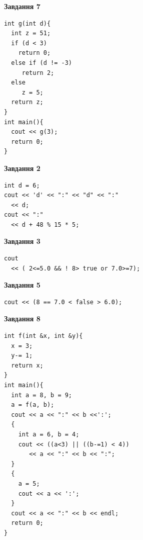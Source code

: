 \documentclass[12pt, ukrainian]{article}
\begin{document}
{\begin {large}
\begin{minipage}[t]{7.0cm}
\begin{center}
\textbf{Завдання 7}
\end{center}
\vspace{-8mm}

\begin{verbatim}
int g(int d){
  int z = 51;
  if (d < 3)
    return 0;
  else if (d != -3)
     return 2;
  else
     z = 5;
  return z;
}
int main(){
  cout << g(3);
  return 0;
}
\end{verbatim}

\end{minipage}
\vline \hspace{1mm}
\begin{minipage}[t]{11.0cm}

\begin{center}
\textbf{Завдання 2}
\end{center}
\vspace{-8mm}

\begin{verbatim}
int d = 6;
cout << 'd' << ":" << "d" << ":" 
  << d;
cout << ":" 
  << d + 48 % 15 * 5;
\end{verbatim}



\begin{center}
\textbf{Завдання 3}
\end{center}
\vspace{-8mm}

\begin{verbatim}
cout 
  << ( 2<=5.0 && ! 8> true or 7.0>=7);
\end{verbatim}



\begin{center}
\textbf{Завдання 5}
\end{center}
\vspace{-8mm}

\begin{verbatim}
cout << (8 == 7.0 < false > 6.0);
\end{verbatim}



\begin{center}
\textbf{Завдання 8}
\end{center}
\vspace{-8mm}

\begin{verbatim}
int f(int &x, int &y){
  x = 3;
  y-= 1;
  return x;
}
int main(){
  int a = 8, b = 9;
  a = f(a, b);
  cout << a << ":" << b <<':';
  {
    int a = 6, b = 4;
    cout << ((a<3) || ((b-=1) < 4))
       << a << ":" << b << ":";
  }
  {
    a = 5;
    cout << a << ':';
  }
  cout << a << ":" << b << endl;
  return 0;
}
\end{verbatim}


\end{minipage}
\end{large}}
\end{document}
